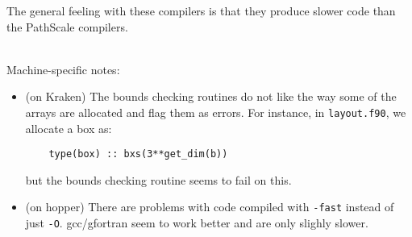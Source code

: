 The general feeling with these compilers is that they produce slower
code than the PathScale compilers.

\ \\
Machine-specific notes:
\begin{itemize}

\item (on Kraken) The bounds checking routines do not like the way some of
the arrays are allocated and flag them as errors.  For instance, in
{\tt layout.f90}, we allocate a box as:
\begin{verbatim}
    type(box) :: bxs(3**get_dim(b))
\end{verbatim}
but the bounds checking routine seems to fail on this.

\item (on hopper) There are problems with code compiled with {\tt -fast}
instead of just {\tt -O}.  gcc/gfortran seem to work better and 
are only slighly slower.
\end{itemize}


